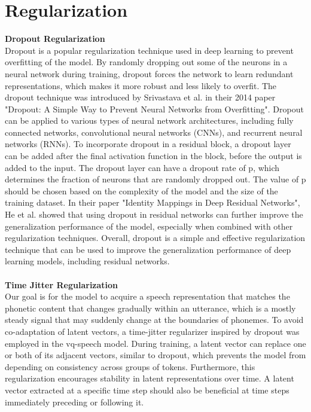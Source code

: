 \documentclass[12pt]{report}
\begin{document}
\section{Regularization}
\textbf{Dropout Regularization}\\
Dropout is a popular regularization technique used in deep learning to prevent overfitting of the model. By randomly dropping out some of the neurons in a neural network during training, dropout forces the network to learn redundant representations, which makes it more robust and less likely to overfit. The dropout technique was introduced by Srivastava et al.\cite{srivastava2014dropout} in their 2014 paper "Dropout: A Simple Way to Prevent Neural Networks from Overfitting". Dropout can be applied to various types of neural network architectures, including fully connected networks, convolutional neural networks (CNNs), and recurrent neural networks (RNNs). To incorporate dropout in a residual block, a dropout layer can be added after the final activation function in the block, before the output is added to the input. The dropout layer can have a dropout rate of p, which determines the fraction of neurons that are randomly dropped out. The value of p should be chosen based on the complexity of the model and the size of the training dataset. In their paper "Identity Mappings in Deep Residual Networks", He et al. \cite{he2016identity} showed that using dropout in residual networks can further improve the generalization performance of the model, especially when combined with other regularization techniques. Overall, dropout is a simple and effective regularization technique that can be used to improve the generalization performance of deep learning models, including residual networks.\\\\
\textbf{Time Jitter Regularization} \\
Our goal is for the model to acquire a speech representation that matches the phonetic content that changes gradually within an utterance, which is a mostly steady signal that may suddenly change at the boundaries of phonemes.
To avoid co-adaptation of latent vectors, a time-jitter regularizer inspired by dropout \cite{srivastava2014dropout} was employed in the vq-speech model\cite{chorowski2019unsupervised}. During training, a latent vector can replace one or both of its adjacent vectors, similar to dropout, which prevents the model from depending on consistency across groups of tokens. Furthermore, this regularization encourages stability in latent representations over time. A latent vector extracted at a specific time step should also be beneficial at time steps immediately preceding or following it.
\end{document}
